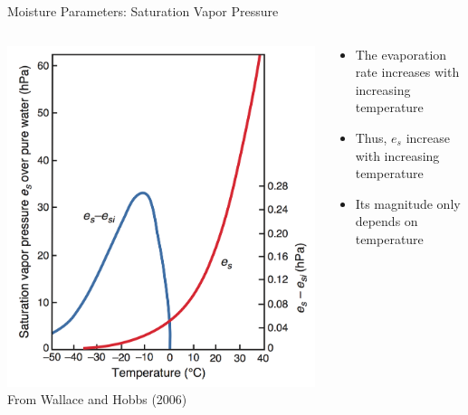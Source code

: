 
\begin{frame}{Moisture Parameters: Saturation Vapor Pressure}
\begin{columns}[T]
    \begin{column}{.4\textwidth}
    \begin{minipage}[c][0.7\textheight][c]{\linewidth}
    \includegraphics[width=1\textwidth]{fig2}\\
    \centering \small From Wallace and Hobbs (2006)
    \end{minipage}
    \end{column}
    \begin{column}{.6\textwidth}
    \begin{minipage}[c][0.6\textheight][c]{\linewidth}
   \begin{itemize}
   	\item The evaporation rate increases with increasing temperature
   	\item Thus, $e_s$ increase with increasing temperature
   	\item Its magnitude only depends on temperature
   \end{itemize}
      \end{minipage}
    \end{column}
  \end{columns}
\end{frame}

